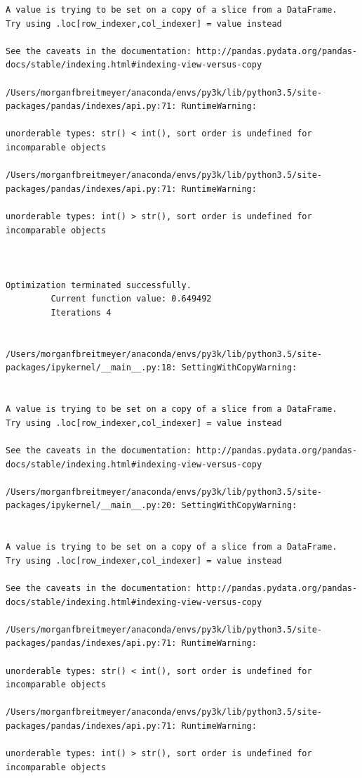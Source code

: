 \begin{lstlisting}
A value is trying to be set on a copy of a slice from a DataFrame.
Try using .loc[row_indexer,col_indexer] = value instead

See the caveats in the documentation: http://pandas.pydata.org/pandas-docs/stable/indexing.html#indexing-view-versus-copy

/Users/morganfbreitmeyer/anaconda/envs/py3k/lib/python3.5/site-packages/pandas/indexes/api.py:71: RuntimeWarning:

unorderable types: str() < int(), sort order is undefined for incomparable objects

/Users/morganfbreitmeyer/anaconda/envs/py3k/lib/python3.5/site-packages/pandas/indexes/api.py:71: RuntimeWarning:

unorderable types: int() > str(), sort order is undefined for incomparable objects



Optimization terminated successfully.
         Current function value: 0.649492
         Iterations 4


/Users/morganfbreitmeyer/anaconda/envs/py3k/lib/python3.5/site-packages/ipykernel/__main__.py:18: SettingWithCopyWarning:


A value is trying to be set on a copy of a slice from a DataFrame.
Try using .loc[row_indexer,col_indexer] = value instead

See the caveats in the documentation: http://pandas.pydata.org/pandas-docs/stable/indexing.html#indexing-view-versus-copy

/Users/morganfbreitmeyer/anaconda/envs/py3k/lib/python3.5/site-packages/ipykernel/__main__.py:20: SettingWithCopyWarning:


A value is trying to be set on a copy of a slice from a DataFrame.
Try using .loc[row_indexer,col_indexer] = value instead

See the caveats in the documentation: http://pandas.pydata.org/pandas-docs/stable/indexing.html#indexing-view-versus-copy

/Users/morganfbreitmeyer/anaconda/envs/py3k/lib/python3.5/site-packages/pandas/indexes/api.py:71: RuntimeWarning:

unorderable types: str() < int(), sort order is undefined for incomparable objects

/Users/morganfbreitmeyer/anaconda/envs/py3k/lib/python3.5/site-packages/pandas/indexes/api.py:71: RuntimeWarning:

unorderable types: int() > str(), sort order is undefined for incomparable objects




\end{lstlisting}
